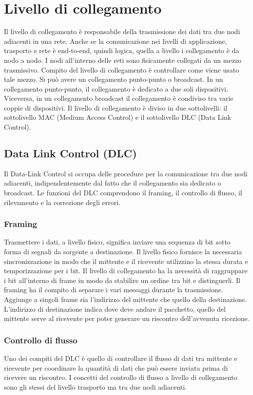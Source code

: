 \documentclass[12pt]{report}
\begin{document}
\chapter{Livello di collegamento}
Il livello di collegamento è responsabile della trasmissione dei dati tra due nodi adiacenti in una rete. Anche se la comunicazione nei livelli di applicazione, trasporto e rete è end-to-end, quindi logica, quella a livello i collegamento è da nodo a nodo. I nodi all'interno delle reti sono fisicamente collegati da un mezzo trasmissivo. Compito del livello di collegamento è controllare come viene usato tale mezzo. Si può avere un collegamento punto-punto o broadcast. In un collegamento punto-punto, il collegamento è dedicato a due soli dispositivi. Viceversa, in un collegamento broadcast il collegamento è condiviso tra varie coppie di dispositivi. Il livello di collegamento è diviso in due sottolivelli: il sottolivello MAC (Medium Access Control) e il sottolivello DLC (Data Link Control).

\section{Data Link Control (DLC)}
Il Data-Link Control si occupa delle procedure per la comunicazione tra due nodi adiacenti, indipendentemente dal fatto che il collegamento sia dedicato o broadcast. Le funzioni del DLC comprendono il framing, il controllo di flusso, il rilevamento e la correzione degli errori.

\subsection{Framing}
Trasmettere i dati, a livello fisico, significa inviare una sequenza di bit sotto forma di segnali da sorgente a destinazione. Il livello fisico fornisce la necessaria sincronizzazione in modo che il mittente e il ricevente utilizzino la stessa durata e temporizzazione per i bit. Il livello di collegamento ha la necessità di raggruppare i bit all'interno di frame in modo da stabilire un ordine tra bit e distinguerli. Il framing ha il compito di separare i vari messaggi durante la trasmissione. Aggiunge a singoli frame sia l'indirizzo del mittente che quello della destinazione. L'indirizzo di destinazione indica dove deve andare il pacchetto, quello del mittente serve al ricevente per poter generare un riscontro dell'avvenuta ricezione.

\subsection{Controllo di flusso}
Uno dei compiti del DLC è quello di controllare il flusso di dati tra mittente e ricevente per coordinare la quantità di dati che può essere inviata prima di ricevere un riscontro. I concetti del controllo di flusso a livello di collegamento sono gli stessi del livello trasporto ma tra due nodi adiacenti.
\end{document}
